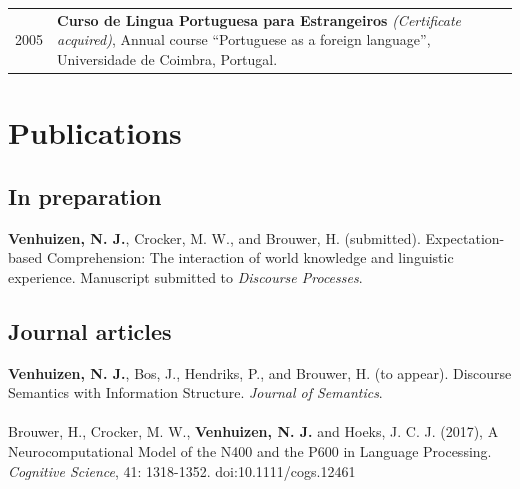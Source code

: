 \documentclass[a4paper,10pt]{article}
\def\leftcolwidth{.12\textwidth}
\def\tablevspace{10pt}
\begin{document}
\vspace{\tablevspace}

\noindent
\begin{tabularx}{\textwidth}{ p{\leftcolwidth} X }
  2005 & \textbf{Curso de Lingua Portuguesa para Estrangeiros} 
         \textit{(Certificate acquired)}, Annual course ``Portuguese as a
         foreign language'', Universidade de Coimbra, Portugal.
\end{tabularx}




\section*{Publications}

\subsection*{In preparation}

\noindent
    \textbf{Venhuizen, N. J.}, Crocker, M. W., and Brouwer, H. (submitted).
    Expectation-based Comprehension: The interaction of world knowledge and
    linguistic experience. Manuscript submitted to \textit{Discourse Processes}.\\

\subsection*{Journal articles}

\noindent
    \textbf{Venhuizen, N. J.}, Bos, J., Hendriks, P., and Brouwer, H.
    (to appear). Discourse Semantics with Information Structure.
    \textit{Journal of Semantics}.\\
    \\
    Brouwer, H., Crocker, M. W., \textbf{Venhuizen, N. J.} and Hoeks, J. C.
    J. (2017), A Neurocomputational Model of the N400 and the P600 in
    Language Processing. \textit{Cognitive Science}, 41: 1318-1352.
    doi:10.1111/cogs.12461
\end{document}
